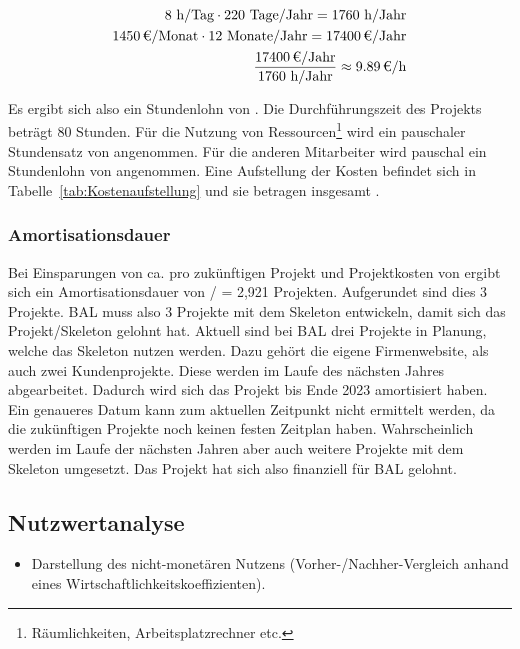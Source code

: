 \begin{eqnarray}
8 \mbox{ h/Tag} \cdot 220 \mbox{ Tage/Jahr} = 1760 \mbox{ h/Jahr}\\
\eur{1450}\mbox{/Monat} \cdot 12 \mbox{ Monate/Jahr} = \eur{17400} \mbox{/Jahr}\\
\frac{\eur{17400} \mbox{/Jahr}}{1760 \mbox{ h/Jahr}} \approx \eur{9.89}\mbox{/h}
\end{eqnarray}

Es ergibt sich also ein Stundenlohn von . 
Die Durchführungszeit des Projekts beträgt 80 Stunden. Für die Nutzung von Ressourcen\footnote{Räumlichkeiten, Arbeitsplatzrechner etc.} wird 
ein pauschaler Stundensatz von  angenommen. Für die anderen Mitarbeiter wird pauschal ein Stundenlohn von  angenommen. 
Eine Aufstellung der Kosten befindet sich in Tabelle~\ref{tab:Kostenaufstellung} und sie betragen insgesamt .


\subsubsection{Amortisationsdauer}
\label{sec:Amortisationsdauer}

Bei Einsparungen von ca.  pro zukünftigen Projekt und Projektkosten von  ergibt sich ein Amortisationsdauer von  /  = 2,921 Projekten. Aufgerundet sind dies 3 Projekte. \acs{BAL} muss also 3 Projekte mit dem Skeleton entwickeln, damit sich das Projekt/Skeleton gelohnt hat. Aktuell sind bei \acs{BAL} drei Projekte in Planung, welche das Skeleton nutzen werden. Dazu gehört die eigene Firmenwebsite, als auch zwei Kundenprojekte. Diese werden im Laufe des nächsten Jahres abgearbeitet. Dadurch wird sich das Projekt bis Ende 2023 amortisiert haben. Ein genaueres Datum kann zum aktuellen Zeitpunkt nicht ermittelt werden, da die zukünftigen Projekte noch keinen festen Zeitplan haben. Wahrscheinlich werden im Laufe der nächsten Jahren aber auch weitere Projekte mit dem Skeleton umgesetzt. Das Projekt hat sich also finanziell für \acs{BAL} gelohnt.


\subsection{Nutzwertanalyse}
\label{sec:Nutzwertanalyse}
\begin{itemize}
	\item Darstellung des nicht-monetären Nutzens (\zB Vorher-/Nachher-Vergleich anhand eines Wirtschaftlichkeitskoeffizienten). 
\end{itemize}

